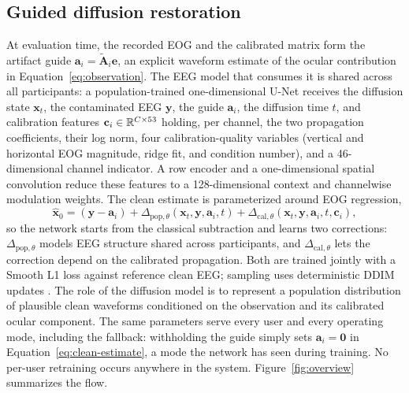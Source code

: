 \subsection{Guided diffusion restoration}
\label{sec:method-diffusion}

At evaluation time, the recorded EOG and the calibrated matrix form the artifact guide $\mathbf{a}_i=\widetilde{\mathbf{A}}_i\mathbf{e}$, an explicit waveform estimate of the ocular contribution in Equation~\ref{eq:observation}. The EEG model that consumes it is shared across all participants: a population-trained one-dimensional U-Net receives the diffusion state $\mathbf{x}_t$, the contaminated EEG $\mathbf{y}$, the guide $\mathbf{a}_i$, the diffusion time $t$, and calibration features $\mathbf{c}_i\in\mathbb{R}^{C\times 53}$ holding, per channel, the two propagation coefficients, their log norm, four calibration-quality variables (vertical and horizontal EOG magnitude, ridge fit, and condition number), and a 46-dimensional channel indicator. A row encoder and a one-dimensional spatial convolution reduce these features to a 128-dimensional context and channelwise modulation weights. The clean estimate is parameterized around EOG regression,
\begin{equation}
 \widehat{\mathbf{x}}_0=
 (\mathbf{y}-\mathbf{a}_i)
 +\Delta_{\mathrm{pop},\theta}(\mathbf{x}_t,\mathbf{y},\mathbf{a}_i,t)
 +\Delta_{\mathrm{cal},\theta}(\mathbf{x}_t,\mathbf{y},\mathbf{a}_i,t,
 \mathbf{c}_i),
 \label{eq:clean-estimate}
\end{equation}
so the network starts from the classical subtraction and learns two corrections: $\Delta_{\mathrm{pop},\theta}$ models EEG structure shared across participants, and $\Delta_{\mathrm{cal},\theta}$ lets the correction depend on the calibrated propagation. Both are trained jointly with a Smooth L1 loss against reference clean EEG; sampling uses deterministic DDIM updates \cite{song2020ddim}. The role of the diffusion model is to represent a population distribution of plausible clean waveforms conditioned on the observation and its calibrated ocular component. The same parameters serve every user and every operating mode, including the fallback: withholding the guide simply sets $\mathbf{a}_i=\mathbf{0}$ in Equation~\ref{eq:clean-estimate}, a mode the network has seen during training. No per-user retraining occurs anywhere in the system. Figure~\ref{fig:overview} summarizes the flow.

